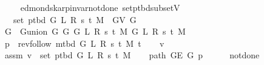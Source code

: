 \begin{isabellebody}
\ \ \isamarkupfalse%
\isanewline
{}\isamarkupfalse%
%
\endisatagproof
{\isafoldproof}%
%
\isadelimproof
\isanewline
%
\endisadelimproof
%
\isadeliminvisible
\isanewline
%
\endisadeliminvisible
%
\isataginvisible
{}\isamarkupfalse%
\ {\isacharparenleft}{\kern0pt}\ edmonds{\isacharunderscore}{\kern0pt}karp{\isacharunderscore}{\kern0pt}invar{\isacharunderscore}{\kern0pt}not{\isacharunderscore}{\kern0pt}done{\isacharunderscore}{\kern0pt}{}{\isacharparenright}{\kern0pt}\ set{\isacharunderscore}{\kern0pt}p{\isacharunderscore}{\kern0pt}tbd{\isacharunderscore}{\kern0pt}subset{\isacharunderscore}{\kern0pt}V{\isacharcolon}{\kern0pt}\isanewline
\ \ \ {\isachardoublequoteopen}set\ {\isacharparenleft}{\kern0pt}p{\isacharunderscore}{\kern0pt}tbd\ G\ L\ R\ s\ t\ M{\isacharparenright}{\kern0pt}\ {\isasymsubseteq}\ G{\isachardot}{\kern0pt}V\ G{\isachardoublequoteclose}%
\endisataginvisible
{\isafoldinvisible}%
%
\isadeliminvisible
\isanewline
%
\endisadeliminvisible
%
\isadelimproof
%
\endisadelimproof
%
\isatagproof
{}\isamarkupfalse%
\isanewline
\ \ \isamarkupfalse%
\ {\isacharquery}{\kern0pt}G\ {\isacharequal}{\kern0pt}\ {\isachardoublequoteopen}G{\isachardot}{\kern0pt}union\ {\isacharparenleft}{\kern0pt}G{}\ G\ {\isacharparenleft}{\kern0pt}G{}\ L\ R\ s\ t\ M{\isacharparenright}{\kern0pt}{\isacharparenright}{\kern0pt}\ {\isacharparenleft}{\kern0pt}G{}\ L\ R\ s\ t\ M{\isacharparenright}{\kern0pt}{\isachardoublequoteclose}\isanewline
\ \ \isamarkupfalse%
\ {\isacharquery}{\kern0pt}p\ {\isacharequal}{\kern0pt}\ {\isachardoublequoteopen}rev{\isacharunderscore}{\kern0pt}follow\ {\isacharparenleft}{\kern0pt}m{\isacharunderscore}{\kern0pt}tbd\ G\ L\ R\ s\ t\ M{\isacharparenright}{\kern0pt}\ t{\isachardoublequoteclose}\isanewline
\ \ \isamarkupfalse%
\ v\isanewline
\ \ \isamarkupfalse%
\ assm{\isacharcolon}{\kern0pt}\ {\isachardoublequoteopen}v\ {\isasymin}\ set\ {\isacharparenleft}{\kern0pt}p{\isacharunderscore}{\kern0pt}tbd\ G\ L\ R\ s\ t\ M{\isacharparenright}{\kern0pt}{\isachardoublequoteclose}\isanewline
\ \ \isamarkupfalse%
\ {\isachardoublequoteopen}path\ {\isacharparenleft}{\kern0pt}G{\isachardot}{\kern0pt}E\ {\isacharquery}{\kern0pt}G{\isacharparenright}{\kern0pt}\ {\isacharquery}{\kern0pt}p{\isachardoublequoteclose}\isanewline
\ \ \ \ \isamarkupfalse%
\ not{\isacharunderscore}{\kern0pt}done{\isacharunderscore}{\kern0pt}{}\isanewline

\end{isabellebody}
